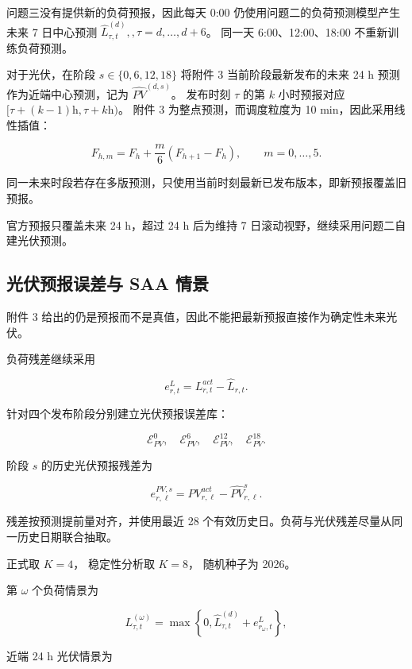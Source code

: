问题三没有提供新的负荷预报，因此每天 0:00 仍使用问题二的负荷预测模型产生未来 7 日中心预测 \(\hat L_{\tau,t}^{(d)},, \tau=d,\ldots,d+6\)。 同一天 6:00、12:00、18:00 不重新训练负荷预测。

对于光伏，在阶段 \(s\in\{0,6,12,18\}\) 将附件 3 当前阶段最新发布的未来 24 h 预测作为近端中心预测，记为 \(\widehat{PV}^{(d,s)}\)。 发布时刻 \(\tau\) 的第 \(k\) 小时预报对应 \([\tau+(k-1)\mathrm{h},\tau+k\mathrm{h})\)。 附件 3 为整点预测，而调度粒度为 10 min，因此采用线性插值：

\begin{equation}
F_{h,m}
=
F_h+\frac{m}{6}(F_{h+1}-F_h),
\qquad
m=0,\ldots,5.
\end{equation}

同一未来时段若存在多版预测，只使用当前时刻最新已发布版本，即新预报覆盖旧预报。

官方预报只覆盖未来 24 h，超过 24 h 后为维持 7 日滚动视野，继续采用问题二自建光伏预测。

\subsection{光伏预报误差与 SAA 情景}

附件 3 给出的仍是预报而不是真值，因此不能把最新预报直接作为确定性未来光伏。

负荷残差继续采用

\[
e^L_{r,t}
=
L^{act}_{r,t}
-
\hat L_{r,t}.
\]

针对四个发布阶段分别建立光伏预报误差库：

\[
\mathcal E_{PV}^{0},
\quad
\mathcal E_{PV}^{6},
\quad
\mathcal E_{PV}^{12},
\quad
\mathcal E_{PV}^{18}.
\]

阶段 \(s\) 的历史光伏预报残差为

\begin{equation}
e^{PV,s}_{r,\ell}
=
PV^{act}_{r,\ell}
-
\widehat{PV}^{s}_{r,\ell}.
\end{equation}

残差按预测提前量对齐，并使用最近 28 个有效历史日。负荷与光伏残差尽量从同一历史日期联合抽取。

正式取 \(K=4\)， 稳定性分析取 \(K=8\)， 随机种子为 2026。

第 \(\omega\) 个负荷情景为

\begin{equation}
L^{(\omega)}_{\tau,t}
=
\max
\left\{
0,
\hat L^{(d)}_{\tau,t}
+
e^L_{r_\omega,t}
\right\},
\end{equation}

近端 24 h 光伏情景为

